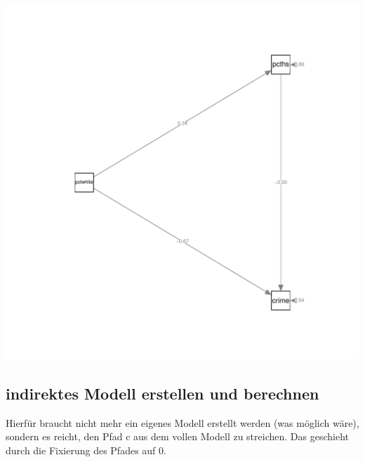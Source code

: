 \documentclass[a4paper]{article}\usepackage[]{graphicx}\usepackage[]{color}
\makeatletter
\def\maxwidth{ %
  \ifdim\Gin@nat@width>\linewidth
    \linewidth
  \else
    \Gin@nat@width
  \fi
}
\newenvironment{knitrout}{}{} %
\makeatother
\begin{document}
\begin{knitrout}
\includegraphics[width=\maxwidth]{figure/unnamed-chunk-6-1} 

\end{knitrout}


\subsection{indirektes Modell erstellen und berechnen}
Hierf\"ur braucht nicht mehr ein eigenes Modell erstellt werden (was möglich wäre), sondern es reicht, den Pfad c aus dem vollen Modell zu streichen. Das geschieht durch die Fixierung des Pfades auf 0.
\end{document}
